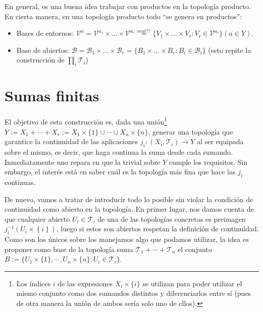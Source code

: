 \begin{obs}
En general, es una buena idea trabajar con productos en la topología producto. En cierta manera, en una topología producto todo ``se genera en productos'':
\begin{itemize}
    \item Bases de entornos: $\mathcal{V}^a = \mathcal{V}^{a_1} \times \ldots \times \mathcal{V}^{a_r} \stackrel{mut??}{=} \{V_1 \times \ldots \times V_r: V_i \in \mathcal{V}^{a_i}\} \left( a \in Y \right)$.
    \item Base de abiertos: $\mathcal{B} = \mathcal{B}_1 \times \ldots \times \mathcal{B}_r = \{B_1 \times \ldots \times B_r: B_i \in \mathcal{B}_i\}$ (esto repite la construcción de $\prod_{i} \mathcal{T}_i$)
\end{itemize}
\end{obs}

\section{Sumas finitas}%
\label{sec:sumas_finitas}
El objetivo de esta construcción es, dada una unión\footnote{Los índices $i$ de las expresiones $X_i\times\{i\}$ se utilizan para poder utilizar el mismo conjunto como dos sumandos distintos y diferenciarlos entre sí (pues de otra manera la unión de ambos sería solo uno de ellos).} $Y := X_1 + \cdots + X_r := X_1 \times \{1\} \cup \cdots \cup X_n\times\{n\}$, generar una topología que garantice la continuidad de las aplicaciones $j_i: \left( X_i, \mathcal{T}_i \right) \rightarrow Y$ al ser equipada sobre el mismo, es decir, que haga continua la suma desde cada sumando. Inmediatamente uno repara en que la trivial sobre $Y$ cumple los requisitos. Sin embargo, el interés está en saber cuál es la topología más fina que hace las $j_i$ continuas.

De nuevo, vamos a tratar de introducir todo lo posible sin violar la condición de continuidad como abierto en la topología. En primer lugar, nos damos cuenta de que cualquier abierto $U_i \in \mathcal{T}_i$ de una de las topologías concretas es preimagen $j_i^{-1}\left( U_i \times \left\{ i \right\} \right)$, luego si estos son abiertos respetan la definición de continuidad. Como son los únicos sobre los manejamos algo que podamos utilizar, la idea es proponer como base de la topología suma $\mathcal{T}_1 + \cdots + \mathcal{T}_n$ el conjunto $B := \{U_1\times\{1\}, \cdots, U_n\times\{n\} : U_i \in \mathcal{T}_i\}$.

